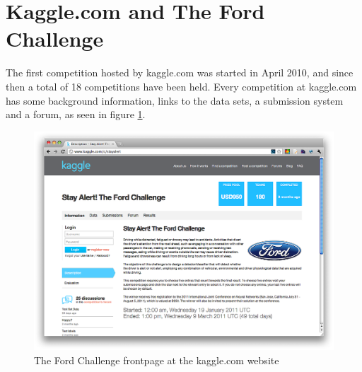 \section{Kaggle.com and The Ford Challenge}
The first competition hosted by kaggle.com was started in April 2010, and since then a total of 18 competitions have been held. Every competition at kaggle.com has some background information, links to the data sets, a submission system and a forum, as seen in figure \ref{fig:fordchallenge_frontpage}. \par

\begin{figure}[tbhHp]
    \centering
        \includegraphics[width=.9\textwidth]{media/fordchallenge_frontpage.png}
    \caption{The Ford Challenge frontpage at the kaggle.com website}
    \label{fig:fordchallenge_frontpage}
\end{figure}


